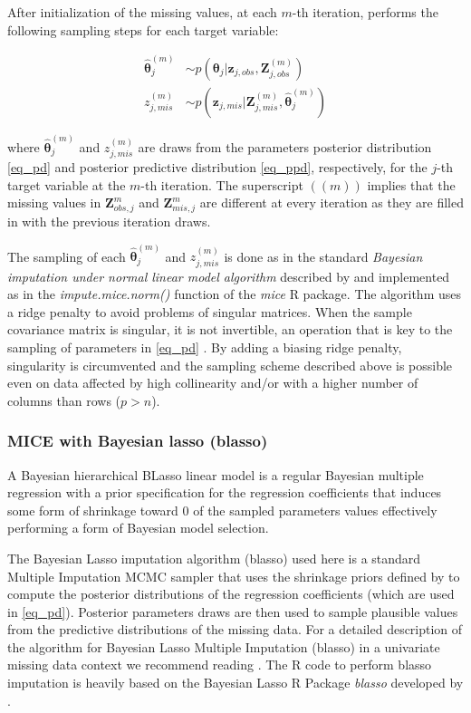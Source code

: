 	After initialization of the missing values, at each $m$-th iteration, performs the following sampling steps
	for each target variable:

	\begin{align}
	\hat{\bm{\theta}}_{j}^{(m)} &\sim p(\bm{\theta}_j | \bm{z}_{j, obs}, \bm{Z}_{j, obs}^{(m)}) \label{eq_pd}\\
	z_{j, mis}^{(m)} &\sim p(\bm{z}_{j, mis} | \bm{Z}_{j, mis}^{(m)}, \hat{\bm{\theta}}_{j}^{(m)}) \label{eq_ppd}
	\end{align}

	where $\hat{\bm{\theta}}_{j}^{(m)}$ and $z_{j, mis}^{(m)}$ are draws from the parameters posterior distribution 
	\eqref{eq_pd} and posterior predictive distribution \eqref{eq_ppd}, respectively, for the $j$-th target variable 
	at the $m$-th iteration. The superscript $((m))$ implies that the missing values in $\bm{Z}_{obs, j}^{m}$
	and $\bm{Z}_{mis, j}^{m}$ are different at every iteration as they are filled in with the previous iteration 
	draws.

	The sampling of each $\hat{\bm{\theta}}_{j}^{(m)}$ and $z_{j, mis}^{(m)}$ is done as in the standard 
	\emph{Bayesian imputation under normal linear model algorithm} described by 
	\citep[p. 68, algorithm 3.1]{vanBuuren:2012} and implemented as in the \emph{impute.mice.norm()} 
	function of the \emph{mice} R package.
	The algorithm uses a ridge penalty to avoid problems of singular matrices.
	When the sample covariance matrix is singular, it is not invertible, an operation that
	is key to the sampling of parameters in \eqref{eq_pd} \citep{schafer:1997}.
	By adding a biasing ridge penalty, singularity is circumvented and the sampling scheme described above is 
	possible even on data affected by high collinearity and/or with a higher number of columns than rows
	($p > n$).

\subsubsection{MICE with Bayesian lasso (blasso)}
	A Bayesian hierarchical BLasso linear model is a regular Bayesian multiple regression with a
	prior specification for the regression coefficients that induces some form of shrinkage toward 0 of
	the sampled parameters values \citep{parkCasella:2008, hans:2009} effectively performing a form of 
	Bayesian model selection.

	The Bayesian Lasso imputation algorithm (blasso) used here is a standard Multiple Imputation MCMC sampler 
	that uses the shrinkage priors defined by \citet{hans:2010} to compute the posterior distributions of the 
	regression coefficients (which are used in \eqref{eq_pd}). 
	Posterior parameters draws are then used to sample plausible values from the predictive distributions of 
	the missing data.
	For a detailed description of the algorithm for Bayesian Lasso Multiple Imputation (blasso) in a univariate
	missing data context we recommend reading \cite{zhaoLong:2016}.
	The R code to perform blasso imputation is heavily based on the Bayesian Lasso R Package \emph{blasso} 
	developed by \citet{hans:2010}.

